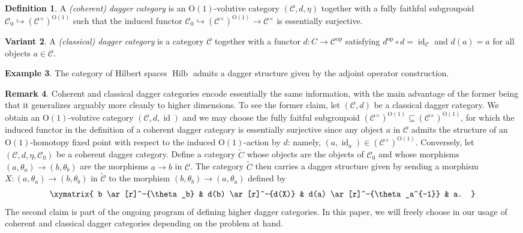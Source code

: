\documentclass{article}
\newcommand{\opp}{\operatorname{op}}%
\newcommand{\id}{\operatorname{id}}%
\newcommand{\Hilb}{\operatorname{Hilb}}%
\newcommand{\Oone}{\operatorname{O(1)}}
\newcommand{\C}{\mathcal{C}}
\numberwithin{equation}{section}
\theoremstyle{definition}
\newtheorem{definition}{Definition}[subsection]
\newtheorem{example}[definition]{Example}
\newtheorem{remark}[definition]{Remark}
\newtheorem{variant}[definition]{Variant}
\theoremstyle{theorem}
\begin{document}
\begin{definition}\label{Definition: coherent dagger category}
    A \emph{(coherent) dagger category} is an $\Oone$-volutive category $(\C,d,\eta)$ together with a fully faithful subgroupoid
    $\C_0 \hookrightarrow (\C^\times)^{\Oone}$ such that the induced functor $\C_0 \hookrightarrow (\C^\times)^{\Oone} \to \C^\times$ is essentially surjective. 
\end{definition}
\begin{variant}
    A \emph{(classical) dagger category} is a category $\C$ together with a functor $d \colon C \to \C^{\opp}$ satisfying $d^{\opp} \circ d=\id_{\C}$ and 
    $d(a) = a$ for all objects $a \in \C$.
\end{variant}
\begin{example}
    The category of Hilbert spaces $\Hilb$ admits a dagger structure given by the adjoint operator construction. 
\end{example}
\begin{remark}
    Coherent and classical dagger categories encode essentially the same information, with the main advantage of the former being that it generalizes arguably 
    more cleanly to higher dimensions. 
    To see the former claim, let $(\C,d)$ be a classical dagger category. We obtain an $\Oone$-volutive category $(\C,d,\id)$ and we may choose the fully faitful 
    subgroupoid $(\C^\times)^{\Oone} \subseteq (\C^\times)^{\Oone}$, for which the induced functor in the definition of a coherent dagger category is essentially 
    surjective since any object $a$ in $\C$ admits the structure of an $\Oone$-homotopy fixed point with respect to the induced $\Oone$-action by $d$: namely, 
    $(a,\id_a) \in (\C^\times)^{\Oone}$. 
    Conversely, let $(\C,d,\eta,\C_0)$ be a coherent dagger category. Define a category $\tilde{C}$ whose objects are the objects of $\C_0$ and 
    whose morphisms $(a,\theta_a) \to (b,\theta_b)$ are the morphisms $a \to b$ in $\C$. The category $\tilde{C}$ then carries a dagger structure given by sending 
    a morphism $X \colon (a,\theta_a) \to (b,\theta_b)$ in $\tilde{\C}$ to the morphism $(b,\theta_b) \to (a,\theta_a)$ defined by
    \begin{equation}
        \xymatrix{
            b \ar[r]^-{\theta_b} & d(b) \ar[r]^-{d(X)} & d(a) \ar[r]^-{\theta_a^{-1}} & a.
        }
    \end{equation}
    The second claim is part of the ongoing program of defining higher dagger categories. In this paper, we will freely choose in our usage of coherent and classical 
    dagger categories depending on the problem at hand. 
\end{remark}
\end{document}
